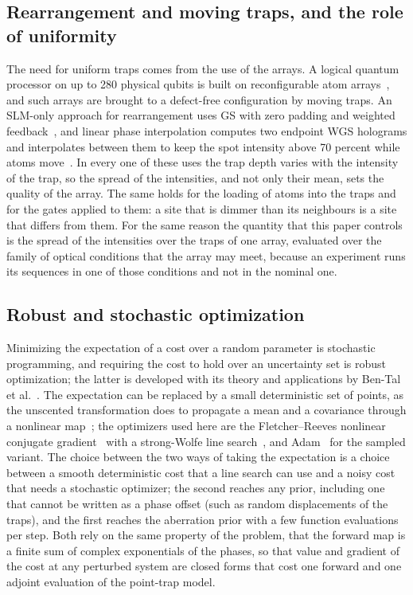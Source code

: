 \subsection{Rearrangement and moving traps, and the role of uniformity}

The need for uniform traps comes from the use of the arrays. A logical quantum processor on up to 280 physical qubits is built on reconfigurable atom arrays~\cite{bluvstein2023}, and such arrays are brought to a defect-free configuration by moving traps. An SLM-only approach for rearrangement uses
GS with zero padding and weighted feedback~\cite{kim2019oe}, and linear phase interpolation computes two endpoint WGS holograms and interpolates between them to keep the spot intensity above 70 percent while atoms move~\cite{knottnerus2025}.
In every one of these uses the trap depth varies with the intensity of the trap, so the spread of the intensities, and not only their mean, sets the quality of the array. The same holds for the loading of atoms into the traps and for the gates applied to them: a site that is dimmer than its neighbours is a site that differs from them. For the same reason the quantity that this paper controls is the spread of the intensities over the traps of one array, evaluated over the family of optical conditions that the array may meet, because an experiment runs its sequences in one of those conditions and not in the nominal one.

\subsection{Robust and stochastic optimization}

Minimizing the expectation of a cost over a random parameter is stochastic programming, and requiring the cost to hold over an uncertainty set is robust optimization; the latter is developed with its theory and applications by Ben-Tal et al.~\cite{bental2009}.
The expectation can be replaced by a small deterministic set of points, as the unscented transformation does to propagate a mean and a covariance through a nonlinear map~\cite{julier2004}; the optimizers used here are the Fletcher--Reeves nonlinear conjugate gradient~\cite{fletcher1964} with a strong-Wolfe line
search~\cite{nocedal2006}, and Adam~\cite{kingma2015} for the sampled variant. The choice between the two ways of taking the expectation is a choice between a smooth deterministic cost that a line search can use and a noisy cost that needs a stochastic optimizer; the second reaches any prior, including one that cannot be written as a phase offset (such as random displacements of the traps), and the first reaches the aberration prior with a few function evaluations per step. Both rely on the same property of the problem, that the forward map is a finite sum of complex exponentials of the phases, so that value and gradient of the cost at any perturbed system are closed forms that cost one forward and one adjoint evaluation of the point-trap model.

